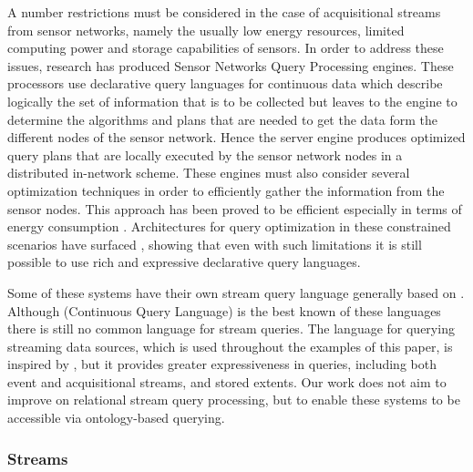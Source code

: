 A number restrictions must be considered in the case of acquisitional streams from sensor networks, namely the usually low energy resources, limited computing power and storage capabilities of sensors. In order to address these issues, research has produced Sensor Networks Query Processing engines.%
These processors use declarative query languages for continuous data which describe logically the set of information that is to be collected but leaves to the engine to determine the algorithms and plans that are needed to get the data form the different nodes of the sensor network. Hence the server engine produces optimized query plans that are locally executed by the sensor network nodes in a distributed in-network scheme. These engines must also consider several optimization techniques in order to efficiently gather the information from the sensor nodes. This approach has been proved to be efficient especially in terms of energy consumption \cite{Madden_05}. Architectures for query optimization in these constrained scenarios have surfaced \cite{Galpin_09,Madden_05}, showing that even with such limitations it is still possible to use rich and expressive declarative query languages.

Some of these systems have their own stream query language generally based on \sql. Although \cql (Continuous Query Language) \cite{Arasu_2006} is the best known of these languages  there is still no common language for stream queries.
The \sneeql\cite{Brenninkmeijer_08} language for querying streaming data sources, which is used throughout the examples of this paper, is inspired by \cql, but it provides greater expressiveness in queries, including both event and acquisitional streams, and stored extents.
Our work does not aim to improve on relational stream query processing, but to enable these systems to be accessible via ontology-based querying.
%
%

\subsubsection{\rdf Streams}
\label{sec:rdfstream}





